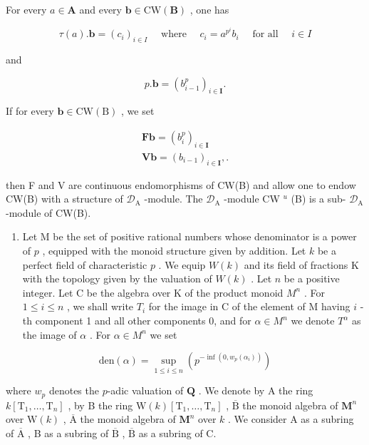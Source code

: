 For every \(a \in \mathbf{A}\) and every \(\pmb{b} \in \mathrm{CW}(\mathbf{B})\) , one has

\[
\tau (a). \boldsymbol {b} = \left(c _ {i}\right) _ {i \in I} \quad \text { where } \quad c _ {i} = a ^ {p ^ {i}} b _ {i} \quad \text { for all } \quad i \in I
\]

and

\[
p. \boldsymbol {b} = (b _ {i - 1} ^ {p}) _ {i \in \mathbf {I}}.
\]

If for every \(\pmb{b}\in \mathrm{CW(B)}\) , we set

\[
\begin{array}{l} \mathbf {F b} = (b _ {i} ^ {p}) _ {i \in \mathbf {I}} \\ \mathbf {V b} = (b _ {i - 1}) _ {i \in \mathbf {I}},. \end{array}
\]

then F and V are continuous endomorphisms of CW(B) and allow one to endow CW(B) with a structure of \(\mathcal{D}_{\mathrm{A}}\) -module. The \(\mathcal{D}_{\mathrm{A}}\) -module CW \(^u\) (B) is a sub- \(\mathcal{D}_{\mathrm{A}}\) -module of CW(B).

\begin{enumerate}
\def\labelenumi{\arabic{enumi})}
\setcounter{enumi}{25}
\tightlist
\item
  Let M be the set of positive rational numbers whose denominator is a power of \(p\) , equipped with the monoid structure given by addition. Let \(k\) be a perfect field of characteristic \(p\) . We equip \(W(k)\) and its field of fractions K with the topology given by the valuation of \(W(k)\) . Let \(n\) be a positive integer. Let C be the algebra over K of the product monoid \(M^n\) . For \(1 \leqslant i \leqslant n\) , we shall write \(T_i\) for the image in C of the element of M having \(i\) -th component 1 and all other components 0, and for \(\alpha \in M^n\) we denote \(T^\alpha\) as the image of \(\alpha\) . For \(\alpha \in M^n\) we set
\end{enumerate}

\[
\mathrm{den} (\alpha) = \sup _ {1 \leqslant i \leqslant n} \left(p ^ {- \inf (0, w _ {p} (\alpha_ {i}))}\right)
\]

where \(w_p\) denotes the \(p\)-adic valuation of \(\mathbf{Q}\) . We denote by A the ring \(k[\mathrm{T}_1, \ldots, \mathrm{T}_n]\) , by B the ring \(\mathrm{W}(k)[\mathrm{T}_1, \ldots, \mathrm{T}_n]\) , \(\overline{\mathrm{B}}\) the monoid algebra of \(\mathbf{M}^n\) over \(\mathrm{W}(k)\) , \(\overline{\mathrm{A}}\) the monoid algebra of \(\mathbf{M}^n\) over \(k\) . We consider A as a subring of \(\overline{\mathrm{A}}\) , B as a subring of \(\overline{\mathrm{B}}\) , \(\overline{\mathrm{B}}\) as a subring of C.

